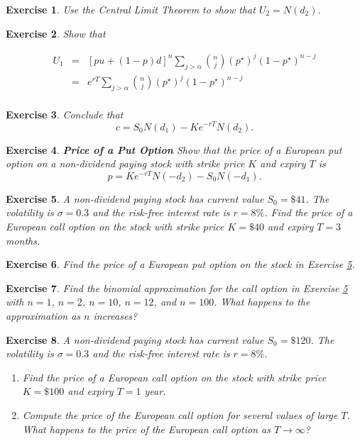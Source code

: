 \documentclass[letterpaper,10pt]{article}
\newcommand{\Sum}[2]{\ensuremath{\sum\limits}_{#1}^{#2}}
\newtheorem{ex}{Exercise}
\begin{document}
\begin{ex} Use the Central Limit Theorem to show that $U_2=N(d_2)$.
\end{ex}

\begin{ex} Show that 

\begin{eqnarray*}
U_1&=&[pu+(1-p)d]^n\Sum{j>\alpha}{}{n\choose j}(p^{\star})^j(1-p^{\star})^{n-j}\\
&=&e^{rT}\Sum{j>\alpha}{}{n\choose j}(p^{\star})^j(1-p^{\star})^{n-j}\\
\end{eqnarray*}
\end{ex}

\begin{ex} 
Conclude that $$c=S_0N(d_1)-Ke^{-rT}N(d_2).$$

\end{ex}

\begin{ex}{\bf Price of a Put Option}
Show that the price of a European put option on a non-dividend paying stock with strike price $K$ and expiry $T$ is $$p=Ke^{-rT}N(-d_2)-S_0N(-d_1).$$
\end{ex}


\begin{ex}\label{call-BS1}
A non-dividend paying stock has current value $S_0=\$41$. The volatility is $\sigma=0.3$ and the risk-free interest rate is $r=8\%$. Find the price of a European call option on the stock with strike price $K=\$40$ and expiry $T=3$ months.
\end{ex}


\begin{ex}
Find the price of a European put option on the stock in Exercise \ref{call-BS1}.
\end{ex}


\begin{ex}
Find the binomial approximation for the call option in Exercise \ref{call-BS1} with $n=1$, $n=2$, $n=10$, $n=12$, and $n=100$.  What happens to the approximation as $n$ increases?
\end{ex}


\begin{ex}
A non-dividend paying stock has current value $S_0=\$120$. The volatility is $\sigma=0.3$ and the risk-free interest rate is $r=8\%$.  

\begin{enumerate}

\item[(a)] Find the price of a European call option on the stock with strike price $K=\$100$ and expiry $T=1$ year.  
\item[(b)] Compute the price of the European call option for several values of large $T$.  What happens to the price of the European call option as $T\rightarrow\infty$?

\end{enumerate}

\end{ex}
\end{document}
